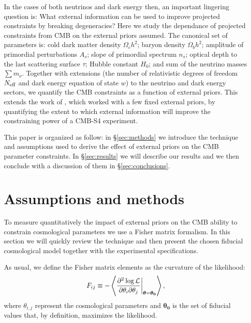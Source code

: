 \documentclass[aps,prd,reprint,superscriptaddress,nofootinbib,floatfix]{revtex4-1}
\newcommand\refsec[1]{\S\ref{sec:#1}}
\begin{document}
In the cases of both neutrinos and dark energy then, an important lingering question is: What external information can be used to improve projected constraints by breaking degeneracies?
Here we study the dependance of projected constraints from CMB on the external priors assumed. The canonical set of parameters is: cold dark matter density $\Omega_ch^2$; baryon density $\Omega_bh^2$; amplitude of primordial perturbations $A_s$; slope of primordial spectrum  $n_s$; optical depth to the last scattering surface $\tau$; Hubble constant $H_0$; and sum of the neutrino masses $\sum m_\nu$.  Together with extensions (the number of relativistic degrees of freedom $N_{\rm eff}$ and dark energy equation of state $w$) to the neutrino and dark energy sectors, we quantify the CMB constraints as a function of external priors. This extends the work of \citet{wu:2014}, which worked with a few fixed external priors, by quantifying the extent to which external information will improve the constraining power of a CMB-S4 experiment. 

This paper is organized as follow: in \refsec{methods} we introduce the technique and assumptions used to derive the effect of external priors on the CMB parameter constraints. In \refsec{results} we will describe our results and we then conclude with a discussion of them in \refsec{conclusions}.



\section{Assumptions and methods \label{sec:methods}}


To measure quantitatively the impact of external priors on the CMB ability to constrain cosmological parameters we use a Fisher matrix formalism. In this section we will quickly review the technique and then present the chosen fiducial cosmological model together with the experimental specifications.

As usual, we define the Fisher matrix elements as the curvature of the likelihood:
\begin{equation}
	\centering
		F_{ij} \equiv - \left\langle\frac{\partial^2 \log \mathcal{L}}{\partial \theta_i \partial \theta_j} \bigg|_{\boldsymbol{\theta} = \boldsymbol{\theta_0}}\right\rangle,
	\label{eqn:Fij_def}
\end{equation}
where $\theta_{i,j}$ represent the cosmological parameters and $\boldsymbol{\theta_0}$ is the set of fiducial values that, by definition, maximizes the likelihood. 
\end{document}
